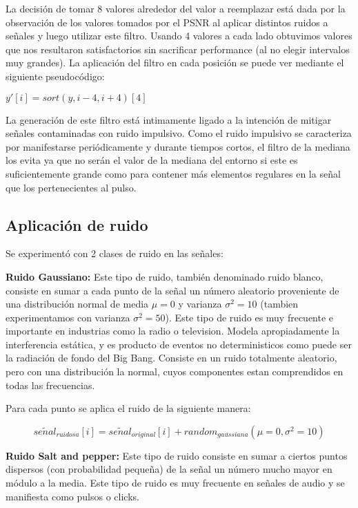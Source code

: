 La decisi\'on de tomar 8 valores alrededor del valor a reemplazar est\'a dada por la observaci\'on
de los valores tomados por el PSNR al aplicar distintos ruidos a se\~nales y luego utilizar este 
filtro. Usando 4 valores a cada lado obtuvimos valores que nos resultaron satisfactorios sin 
sacrificar performance (al no elegir intervalos muy grandes). La aplicaci\'on del filtro en cada
posici\'on se puede ver mediante el siguiente pseudoc\'odigo:

\begin{center}
$y'[i]= sort(y, i - 4, i + 4)[4]$\\
\end{center}

La generaci\'on de este filtro est\'a intimamente ligado a la intenci\'on de mitigar se\~nales contaminadas
con ruido impulsivo. Como el ruido impulsivo se caracteriza por manifestarse peri\'odicamente y durante tiempos
cortos, el filtro de la mediana los evita ya que no ser\'an el valor de la mediana del entorno si este es suficientemente
grande como para contener m\'as elementos regulares en la se\~nal que los pertenecientes al pulso.

\subsection{Aplicaci\'on de ruido}

Se experiment\'o con 2 clases de ruido en las se\~nales:

\begin{itemize}
	\begin{item}
		{\bf Ruido Gaussiano:} Este tipo de ruido, tambi\'en denominado ruido
blanco, consiste en sumar a cada punto de la se\~nal un n\'umero aleatorio
proveniente de una distribuci\'on normal de media $\mu = 0$ y varianza $\sigma^2=10$ (tambien
experimentamos con varianza $\sigma^2=50$). 
Este tipo de ruido es muy frecuente e importante en industrias como la radio o television.
Modela apropiadamente la interferencia est\'atica, y es producto de eventos no deterministicos como 
puede ser la radiaci\'on de fondo del Big Bang. Consiste en un ruido totalmente aleatorio, pero con 
una distribuci\'on la normal, cuyos componentes estan comprendidos en todas las frecuencias.

 	Para cada punto se aplica el ruido de la siguiente manera:

    $$se\widetilde{n}al_{ruidosa}[i] = se\widetilde{n}al_{original}[i] + random_{gaussiana}(\mu=0, \sigma^2=10)$$


	\end{item}

	\begin{item}
		{\bf Ruido Salt and pepper:} Este tipo de ruido consiste en sumar a ciertos puntos dispersos (con probabilidad peque\~na) 
de la se\~nal un n\'umero mucho mayor en m\'odulo a la media. Este tipo de ruido es muy 
frecuente en se\~nales de audio y se manifiesta como pulsos o clicks.
	\end{item}

\end{itemize}

